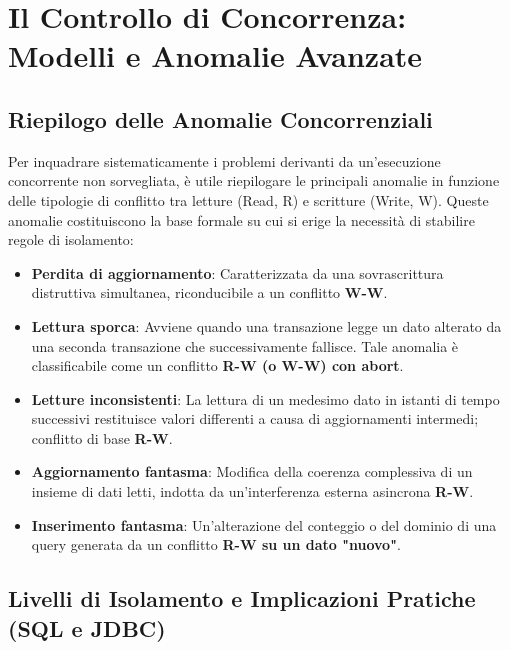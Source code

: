
\chapter{Il Controllo di Concorrenza: Modelli e Anomalie Avanzate}

\section{Riepilogo delle Anomalie Concorrenziali}

Per inquadrare sistematicamente i problemi derivanti da un'esecuzione concorrente non sorvegliata, è utile riepilogare le principali anomalie in funzione delle tipologie di conflitto tra letture (Read, R) e scritture (Write, W). Queste anomalie costituiscono la base formale su cui si erige la necessità di stabilire regole di isolamento:
\begin{itemize}
    \item \textbf{Perdita di aggiornamento}: Caratterizzata da una sovrascrittura distruttiva simultanea, riconducibile a un conflitto \textbf{W-W}.
    \item \textbf{Lettura sporca}: Avviene quando una transazione legge un dato alterato da una seconda transazione che successivamente fallisce. Tale anomalia è classificabile come un conflitto \textbf{R-W (o W-W) con abort}.
    \item \textbf{Letture inconsistenti}: La lettura di un medesimo dato in istanti di tempo successivi restituisce valori differenti a causa di aggiornamenti intermedi; conflitto di base \textbf{R-W}.
    \item \textbf{Aggiornamento fantasma}: Modifica della coerenza complessiva di un insieme di dati letti, indotta da un'interferenza esterna asincrona \textbf{R-W}.
    \item \textbf{Inserimento fantasma}: Un'alterazione del conteggio o del dominio di una query generata da un conflitto \textbf{R-W su un dato "nuovo"}.
\end{itemize}

\section{Livelli di Isolamento e Implicazioni Pratiche (SQL e JDBC)}

